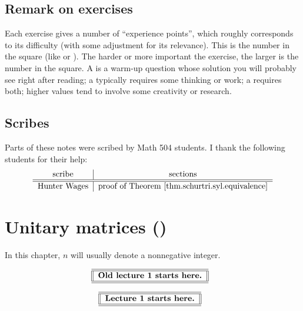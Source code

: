 \documentclass[numbers=enddot,12pt,final,onecolumn,notitlepage]{scrartcl}%
\newcounter{exer}
\numberwithin{exer}{subsection}
\theoremstyle{definition}
\newenvironment{noncompile}{}{}
\begin{document}
\subsection{Remark on exercises}

Each exercise gives a number of \textquotedblleft experience
points\textquotedblright, which roughly corresponds to its difficulty (with
some adjustment for its relevance). This is the number in the square (like
 or ). The harder or more important the exercise, the larger
is the number in the square. A  is a warm-up question whose solution
you will probably see right after reading; a  typically requires some
thinking or work; a  requires both; higher values tend to involve some
creativity or research.

\subsection{Scribes}

Parts of these notes were scribed by Math 504 students. I thank the following
students for their help:%
\[%
\begin{tabular}
[c]{c|c}%
scribe & sections\\\hline\hline
Hunter Wages & proof of Theorem \ref{thm.schurtri.syl.equivalence}%
\end{tabular}
\]


\newpage

\section{Unitary matrices (\cite[\S 2.1]{HorJoh13})}

In this chapter, $n$ will usually denote a nonnegative integer.

\begin{noncompile}%
\[%
\begin{tabular}
[c]{||l||}\hline\hline
\textbf{Old lecture 1 starts here.}\\\hline\hline
\end{tabular}
\ \
\]

\end{noncompile}

%

\[%
\begin{tabular}
[c]{||l||}\hline\hline
\textbf{Lecture 1 starts here.}\\\hline\hline
\end{tabular}
\ \
\]
\end{document}
